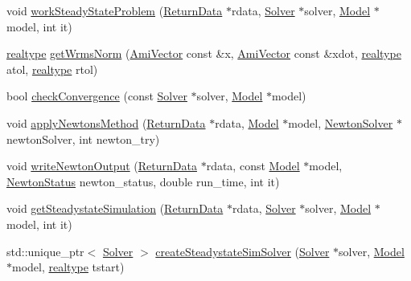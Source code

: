 \begin{DoxyCompactItemize}
\item 
void \mbox{\hyperlink{classamici_1_1_steadystate_problem_aa2630b3401b8f0a50bf50c73d4f39790}{work\+Steady\+State\+Problem}} (\mbox{\hyperlink{classamici_1_1_return_data}{Return\+Data}} $\ast$rdata, \mbox{\hyperlink{classamici_1_1_solver}{Solver}} $\ast$solver, \mbox{\hyperlink{classamici_1_1_model}{Model}} $\ast$model, int it)
\item 
\mbox{\hyperlink{namespaceamici_a1bdce28051d6a53868f7ccbf5f2c14a3}{realtype}} \mbox{\hyperlink{classamici_1_1_steadystate_problem_afd3dce48510d1fce72b18049b40fff5a}{get\+Wrms\+Norm}} (\mbox{\hyperlink{classamici_1_1_ami_vector}{Ami\+Vector}} const \&x, \mbox{\hyperlink{classamici_1_1_ami_vector}{Ami\+Vector}} const \&xdot, \mbox{\hyperlink{namespaceamici_a1bdce28051d6a53868f7ccbf5f2c14a3}{realtype}} atol, \mbox{\hyperlink{namespaceamici_a1bdce28051d6a53868f7ccbf5f2c14a3}{realtype}} rtol)
\item 
bool \mbox{\hyperlink{classamici_1_1_steadystate_problem_a06f944df556560112e76a23213bf3f51}{check\+Convergence}} (const \mbox{\hyperlink{classamici_1_1_solver}{Solver}} $\ast$solver, \mbox{\hyperlink{classamici_1_1_model}{Model}} $\ast$model)
\item 
void \mbox{\hyperlink{classamici_1_1_steadystate_problem_a1c33ff72fd843a1a51cd93448e3e5a77}{apply\+Newtons\+Method}} (\mbox{\hyperlink{classamici_1_1_return_data}{Return\+Data}} $\ast$rdata, \mbox{\hyperlink{classamici_1_1_model}{Model}} $\ast$model, \mbox{\hyperlink{classamici_1_1_newton_solver}{Newton\+Solver}} $\ast$newton\+Solver, int newton\+\_\+try)
\item 
void \mbox{\hyperlink{classamici_1_1_steadystate_problem_a3dba8c3909bae68f98d6bf1bb82099da}{write\+Newton\+Output}} (\mbox{\hyperlink{classamici_1_1_return_data}{Return\+Data}} $\ast$rdata, const \mbox{\hyperlink{classamici_1_1_model}{Model}} $\ast$model, \mbox{\hyperlink{namespaceamici_a3fb34b6904b8b45827b51132977431da}{Newton\+Status}} newton\+\_\+status, double run\+\_\+time, int it)
\item 
void \mbox{\hyperlink{classamici_1_1_steadystate_problem_a7567ea97f4d840e7df61340b5129f4cd}{get\+Steadystate\+Simulation}} (\mbox{\hyperlink{classamici_1_1_return_data}{Return\+Data}} $\ast$rdata, \mbox{\hyperlink{classamici_1_1_solver}{Solver}} $\ast$solver, \mbox{\hyperlink{classamici_1_1_model}{Model}} $\ast$model, int it)
\item 
std\+::unique\+\_\+ptr$<$ \mbox{\hyperlink{classamici_1_1_solver}{Solver}} $>$ \mbox{\hyperlink{classamici_1_1_steadystate_problem_a8e36c9f8f77bf820e7d6deb34007a47d}{create\+Steadystate\+Sim\+Solver}} (\mbox{\hyperlink{classamici_1_1_solver}{Solver}} $\ast$solver, \mbox{\hyperlink{classamici_1_1_model}{Model}} $\ast$model, \mbox{\hyperlink{namespaceamici_a1bdce28051d6a53868f7ccbf5f2c14a3}{realtype}} tstart)

\end{DoxyCompactItemize}
